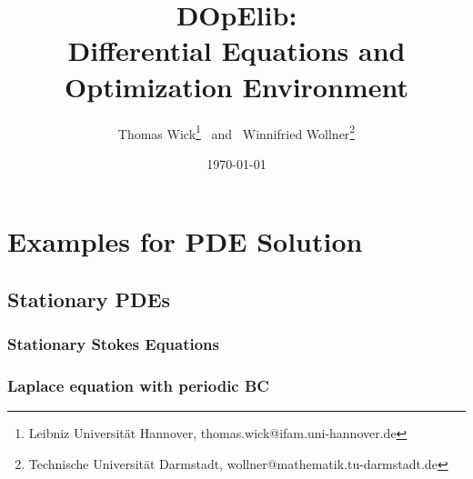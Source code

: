 \documentclass[a4paper,cleardoubleempty]{scrreprt}
\theoremstyle{plain}
\theoremstyle{remark}
\begin{document}
\title{DOpElib:\\ 
Differential Equations and Optimization Environment}
\author{
  Thomas Wick\thanks{Leibniz Universit\"at Hannover, 
    {thomas.wick@ifam.uni-hannover.de}} 
   $\,$ and $\,$
  Winnifried Wollner\thanks{Technische Universität Darmstadt, 
    {wollner@mathematik.tu-darmstadt.de}}
}




\date{\today
\vspace*{8.1cm}
}




\maketitle
\cleardoublepage\pagestyle{headings}
\tableofcontents
\cleardoublepage







\chapter{Examples for PDE Solution}
\label{PDE}
\section{Stationary PDEs} 
\label{PDE_Stat}
\subsection{Stationary Stokes Equations} 
\label{PDE_Stat_Stokes}

\clearpage
\subsection{Laplace equation with periodic BC} 
\label{PDE_Stat_Periodic_Stokes}

\clearpage
\end{document}
